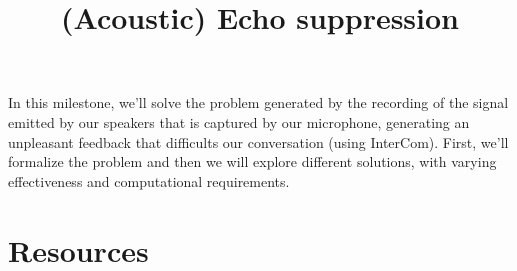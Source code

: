 
\title{(Acoustic) Echo suppression}

\maketitle

\tableofcontents


In this milestone, we'll solve the problem generated by the recording
of the signal emitted by our speakers that is captured by our
microphone, generating an unpleasant feedback that difficults our
conversation (using InterCom). First, we'll formalize the problem and
then we will explore different solutions, with varying effectiveness
and computational requirements.











\section{Resources}

